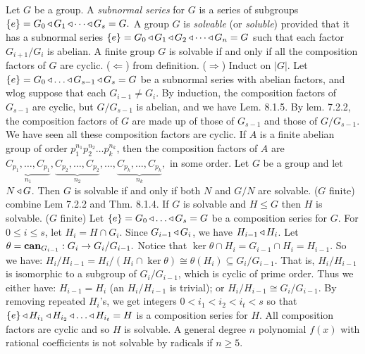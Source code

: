 Let $G$ be a group. A \emph{subnormal series} for $G$ is a series of subgroups 
$\{e\} = G_0 \operatorname{\triangleleft} G_1 \operatorname{\triangleleft} \cdots \operatorname{\triangleleft} G_s = G.$
 A group $G$ is \emph{solvable} (or \emph{soluble}) provided that it has a subnormal series 
$\{e\} = G_0 \operatorname{\triangleleft} G_1 \operatorname{\triangleleft} G_2 \operatorname{\triangleleft} \cdots \operatorname{\triangleleft} G_n = G$ 
such that each factor $G_{i+1}/G_i$ is abelian.
 A finite group $G$ is solvable if and only if all the composition factors of $G$ are cyclic.
\wpf{} ($\Leftarrow$) from definition. 
($\Rightarrow$) Induct on $|G|$. Let 
$\{e\} = G_0 \operatorname{\triangleleft} \ldots \operatorname{\triangleleft} G_{s-1} \operatorname{\triangleleft} G_{s} = G$ be a subnormal series with abelian factors, and wlog suppose that each $G_{i-1} \ne G_i$. By induction, the composition factors of $G_{s-1}$ are cyclic, but $G/G_{s-1}$ is abelian, and we have Lem. 8.1.5. By lem. 7.2.2, the composition factors of $G$ are made up of those of $G_{s-1}$ and those of $G/G_{s-1}$. We have seen all these composition factors are cyclic.
 If $A$ is a finite abelian group of order $p^{n_1}_1 p^{n_2}_2 \ldots p^{n_k}_k$, then the composition factors of $A$ are 
$\underbrace{C_{p_1}, \ldots, C_{p_1}}_{n_1},\underbrace{C_{p_2}, \ldots, C_{p_2}}_{n_2},\ldots,\underbrace{C_{p_k}, \ldots, C_{p_k}}_{n_k},$ in some order.
 Let $G$ be a group and let $N \operatorname{\triangleleft} G$. Then $G$ is solvable if and only if both $N$ and $G/N$ are solvable.
\wpf{} ($G$ finite) combine Lem 7.2.2 and Thm. 8.1.4.
 If $G$ is solvable and $H \le G$ then $H$ is solvable.
\wpf{} ($G$ finite) Let $\{e\} = G_0 \operatorname{\triangleleft} \ldots \operatorname{\triangleleft} G_{s} = G$ be a composition series for $G$. For $0 \le i \le s$, let $H_i = H \cap G_i$. Since $G_{i-1} \operatorname{\triangleleft} G_{i}$, we have $H_{i-1} \operatorname{\triangleleft} H_i$.
Let $\theta = \text{\textbf{can}}_{G_{i-1}} : G_i \to G_i/G_{i-1}.$ Notice that $\ker\theta \cap H_i = G_{i-1} \cap H_i = H_{i-1}$. So we have: 
$H_i/H_{i-1} = H_i/(H_i \cap \ker\theta) \cong \theta(H_i) \subseteq G_i/G_{i-1}$. That is, $H_i/H_{i-1}$ is isomorphic to a subgroup of $G_i/G_{i-1}$, which is cyclic of prime order. Thus we either have: $H_{i-1} = H_i$ (an $H_i/H_{i-1}$ is trivial); or $H_i/H_{i-1} \cong G_i/G_{i-1}$. By removing repeated $H_i$'s, we get integers $0 < i_1 < i_2 < i_t < s$ so that 
$\{e\} \operatorname{\triangleleft} H_{i_1} \operatorname{\triangleleft} H_{i_2} \operatorname{\triangleleft} \ldots \operatorname{\triangleleft} H_{i_t} = H$ is a composition series for $H$. All composition factors are cyclic and so $H$ is solvable.
 A general degree $n$ polynomial $f(x)$ with rational coefficients is not solvable by radicals if $n \ge 5$.